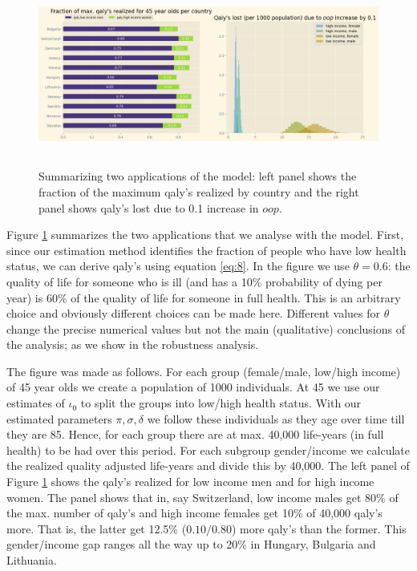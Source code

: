 \documentclass[a4paper,12pt]{article}
\begin{document}
\begin{figure}[htbp]
\centering
\includegraphics[height=6cm]{./figures/summary_two_applications.png}
\caption{\label{fig:applications}Summarizing two applications of the model: left panel shows the fraction of the maximum qaly's realized by country and the right panel shows qaly's lost due to 0.1 increase in \(oop\).}
\end{figure}

Figure \ref{fig:applications} summarizes the two applications that we analyse with the model. First, since our estimation method identifies the fraction of people who have low health status, we can derive qaly's using equation \eqref{eq:8}. In the figure we use \(\theta=0.6\): the quality of life for someone who is ill (and has a 10\% probability of dying per year) is 60\% of the quality of life for someone in full health. This is an arbitrary choice and obviously different choices can be made here. Different values for \(\theta\) change the precise numerical values but not the main (qualitative) conclusions of the analysis; as we show in the robustness analysis.

The figure was made as follows. For each group (female/male, low/high income) of 45 year olds we create a population of 1000 individuals. At 45 we use our estimates of \(\iota_0\) to split the groups into low/high health status. With our estimated parameters \(\pi,\sigma,\delta\) we follow these individuals as they age over time till they are 85. Hence, for each group there are at max. 40,000 life-years (in full health) to be had over this period. For each subgroup gender/income we calculate the realized quality adjusted life-years and divide this by 40,000. The left panel of Figure \ref{fig:applications} shows the qaly's realized for low income men and for high income women.  The panel shows that in, say Switzerland, low income males get 80\% of the max. number of qaly's and high income females get 10\% of 40,000 qaly's more. That is, the latter get 12.5\% (\(0.10/0.80\)) more qaly's than the former. This gender/income gap ranges all the way up to 20\% in Hungary, Bulgaria and Lithuania.
\end{document}
